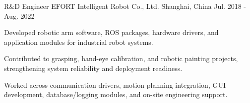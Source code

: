 

\begin{cventries}

  \cventry
    {R\&D Engineer}
    {EFORT Intelligent Robot Co., Ltd.}
    {Shanghai, China}
    {Jul. 2018 - Aug. 2022}
    {
      \begin{cvitems}
        \item {Developed robotic arm software, ROS packages, hardware drivers, and application modules for industrial robot systems.}
        \item {Contributed to grasping, hand-eye calibration, and robotic painting projects, strengthening system reliability and deployment readiness.}
        \item {Worked across communication drivers, motion planning integration, GUI development, database/logging modules, and on-site engineering support.}
      \end{cvitems}
    }

\end{cventries}
